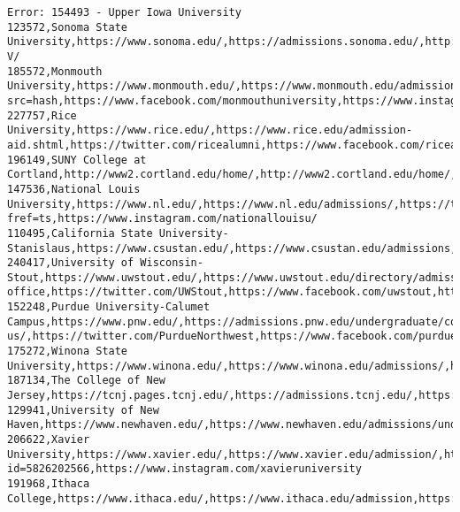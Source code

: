 \documentclass[11pt]{article}
\begin{document}
\begin{Verbatim}[commandchars=\\\{\}]
Error: 154493 - Upper Iowa University
123572,Sonoma State University,https://www.sonoma.edu/,https://admissions.sonoma.edu/,http://twitter.com/JudySakaki,https://www.facebook.com/sonomastateuniversity,https://www.instagram.com/p/BMFFQTOhH-V/
185572,Monmouth University,https://www.monmouth.edu/,https://www.monmouth.edu/admission/,https://twitter.com/hashtag/ThisIsMonmouth?src=hash,https://www.facebook.com/monmouthuniversity,https://www.instagram.com/p/BpZvwgcAnxW
227757,Rice University,https://www.rice.edu/,https://www.rice.edu/admission-aid.shtml,https://twitter.com/ricealumni,https://www.facebook.com/ricealumni,https://instagram.com/riceuniversity
196149,SUNY College at Cortland,http://www2.cortland.edu/home/,http://www2.cortland.edu/home/,https://twitter.com/suny\_cortland,https://www.facebook.com/sunycortland,https://instagram.com/sunycortland/
147536,National Louis University,https://www.nl.edu/,https://www.nl.edu/admissions/,https://twitter.com/NationalLouisU,https://www.facebook.com/NationalLouis?fref=ts,https://www.instagram.com/nationallouisu/
110495,California State University-Stanislaus,https://www.csustan.edu/,https://www.csustan.edu/admissions,https://twitter.com/stan\_state,https://www.facebook.com/stanstate,http://instagram.com/stanstate
240417,University of Wisconsin-Stout,https://www.uwstout.edu/,https://www.uwstout.edu/directory/admissions-office,https://twitter.com/UWStout,https://www.facebook.com/uwstout,https://www.instagram.com/uwstoutpics/
152248,Purdue University-Calumet Campus,https://www.pnw.edu/,https://admissions.pnw.edu/undergraduate/contact-us/,https://twitter.com/PurdueNorthwest,https://www.facebook.com/purduenorthwest/,https://www.instagram.com/purduenorthwest/
175272,Winona State University,https://www.winona.edu/,https://www.winona.edu/admissions/,https://twitter.com/winonastateu,https://www.facebook.com/WinonaStateU,https://www.instagram.com/WinonaStateU
187134,The College of New Jersey,https://tcnj.pages.tcnj.edu/,https://admissions.tcnj.edu/,https://twitter.com/tcnj,https://www.facebook.com/tcnjlions,https://instagram.com/tcnj\_official
129941,University of New Haven,https://www.newhaven.edu/,https://www.newhaven.edu/admissions/undergraduate/,https://twitter.com/unewhaven,https://www.facebook.com/unewhaven/,https://www.instagram.com/unewhaven/
206622,Xavier University,https://www.xavier.edu/,https://www.xavier.edu/admission/,https://www.twitter.com/XavierUniv,https://facebook.com/profile.php?id=5826202566,https://www.instagram.com/xavieruniversity
191968,Ithaca College,https://www.ithaca.edu/,https://www.ithaca.edu/admission,https://twitter.com/IthacaCollege/,https://www.facebook.com/ithacacollege/,https://www.instagram.com/ithacacollege/

\end{Verbatim}
\end{document}
